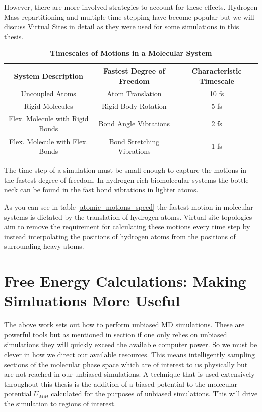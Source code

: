 However, there are more involved strategies to account for these effects. Hydrogen Mass repartitioning and multiple time stepping have become popular but we will discuss Virtual Sites in detail as they were used for some simulations in this thesis.  

\begin{flushleft}
\begin{table}
	\begin{center}   
\begin{tabular} { |c|c|c| } 
	\hline
	System Description & Fastest Degree of Freedom & Characteristic Timescale \\ 
	\hline
	Uncoupled Atoms  & Atom Translation & 10 fs  \\ 
	Rigid Molecules & Rigid Body Rotation & 5 fs \\  
	Flex. Molecule with Rigid Bonds & Bond Angle Vibrations & 2 fs  \\ 
	 Flex. Molecule with Flex. Bonds & Bond Stretching Vibrations & 1 fs  \\ 
	\hline
\end{tabular}
\end{center}
	\captionsetup{singlelinecheck = false, justification=raggedright}
	\caption[Timescales of Motions in a Molecular System]{\textbf{Timescales of Motions in a Molecular System}} {The time step of a simulation must be small enough to capture the motions in the fastest degree of freedom. In hydrogen-rich biomolecular systems the bottle neck can be found in the fast bond vibrations in lighter atoms. }
\end{table}
\end{flushleft}

As you can see in table \ref{atomic_motions_speed} the fastest motion in molecular systems is dictated by the translation of hydrogen atoms. Virtual site topologies aim to remove the requirement for calculating these motions every time step by instead interpolating the positions of hydrogen atoms from the positions of surrounding heavy atoms. 

\section{Free Energy Calculations: Making Simluations More Useful}
The above work sets out how to perform unbiased MD simulations. These are powerful tools but as mentioned in section  if one only relies on unbiased simulations they will quickly exceed the available computer power. So we must be clever in how we direct our available resources. This means intelligently sampling sections of the molecular phase space which are of interest to us physically but are not reached in our unbiased simulations. A technique that is used extensively throughout this thesis is the addition of a biased potential to the molecular potential $U_{MM}$ calculated for the purposes of unbiased simulations. This will drive the simulation to regions of interest. 

